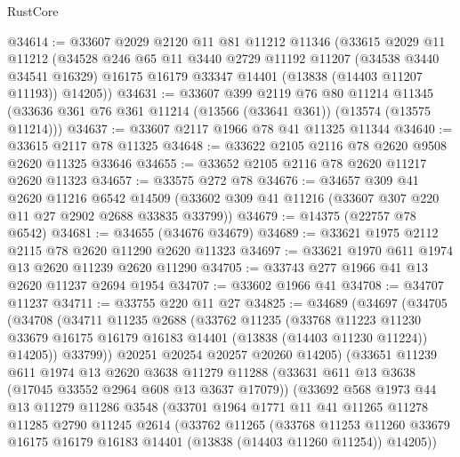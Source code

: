 \begin{lexlean}{RustCore}
\begin{coremodule}
@34614 := @33607
    @2029
    @2120
    @11
    @81
    @11212
    @11346
    (@33615
      @2029
      @11
      @11212
      (@34528
        @246
        @65
        @11
        @3440
        @2729
        @11192
        @11207
        (@34538 @3440 @34541 @16329)
        @16175
        @16179
        @33347
        @14401
        (@13838 (@14403 @11207 @11193))
        @14205))
@34631 := @33607
    @399
    @2119
    @76
    @80
    @11214
    @11345
    (@33636 @361 @76 @361 @11214 (@13566 (@33641 @361)) (@13574 (@13575 @11214)))
@34637 := @33607 @2117 @1966 @78 @41 @11325 @11344
@34640 := @33615 @2117 @78 @11325
@34648 := @33622 @2105 @2116 @78 @2620 @9508 @2620 @11325 @33646
@34655 := @33652 @2105 @2116 @78 @2620 @11217 @2620 @11323
@34657 := @33575 @272 @78
@34676 := @34657
    @309
    @41
    @2620
    @11216
    @6542
    @14509
    (@33602 @309 @41 @11216 (@33607 @307 @220 @11 @27 @2902 @2688 @33835 @33799))
@34679 := @14375 (@22757 @78 @6542)
@34681 := @34655 (@34676 @34679)
@34689 := @33621 @1975 @2112 @2115 @78 @2620 @11290 @2620 @11323
@34697 := @33621 @1970 @611 @1974 @13 @2620 @11239 @2620 @11290
@34705 := @33743 @277 @1966 @41 @13 @2620 @11237 @2694 @1954
@34707 := @33602 @1966 @41
@34708 := @34707 @11237
@34711 := @33755 @220 @11 @27
@34825 := @34689
    (@34697
      (@34705
        (@34708
          (@34711
            @11235
            @2688
            (@33762
              @11235
              (@33768
                @11223
                @11230
                @33679
                @16175
                @16179
                @16183
                @14401
                (@13838 (@14403 @11230 @11224))
                @14205))
            @33799))
        @20251
        @20254
        @20257
        @20260
        @14205)
      (@33651
        @11239
        @611
        @1974
        @13
        @2620
        @3638
        @11279
        @11288
        (@33631 @611 @13 @3638 (@17045 @33552 @2964 @608 @13 @3637 @17079))
        (@33692
          @568
          @1973
          @44
          @13
          @11279
          @11286
          @3548
          (@33701
            @1964
            @1771
            @11
            @41
            @11265
            @11278
            @11285
            @2790
            @11245
            @2614
            (@33762
              @11265
              (@33768
                @11253
                @11260
                @33679
                @16175
                @16179
                @16183
                @14401
                (@13838 (@14403 @11260 @11254))
                @14205))

\end{coremodule}
\end{lexlean}
